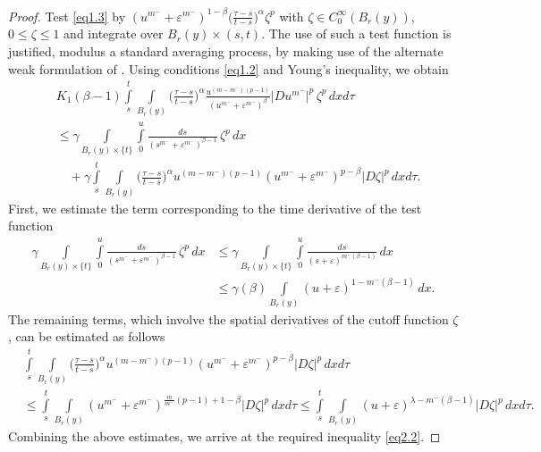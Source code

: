 \documentclass[a4paper,11pt,fullpage]{article}
\numberwithin{equation}{section}
\begin{document}
\begin{proof}
Test \eqref{eq1.3} by $(u^{m^-}+\varepsilon^{m^-})^{1-\beta}\big(\frac{\tau-s}{t-s}\big)^\alpha \zeta^p$ with $\zeta\in C_0^\infty(B_r(y))$, $0\leqslant\zeta\leqslant1$ and integrate over $B_r(y)\times(s, t)$.
The use of such a test function is justified, modulus a standard
 averaging process, by making use of the alternate weak formulation of \cite{KL}. Using conditions \eqref{eq1.2} and  Young's inequality, we obtain
\begin{equation*}
\begin{aligned}
& K_1(\beta-1)\int\limits_s^t\int\limits_{B_r(y)}\Big(\frac{\tau-s}{t-s}\Big)^\alpha 
\frac{u^{(m-m^-)(p-1)}}{(u^{m^-}+\varepsilon^{m^-})^\beta}|D u^{m^-}|^{p}\,\zeta^{p}\,dx d\tau
\\&\leqslant \gamma \int\limits_{B_r(y)\times\{t\}}\int\limits_0^u\frac{ds}{(s^{m^-}+\varepsilon^{m^-})^{\beta-1}}\,\zeta^{p}\,dx
\\&\quad+\gamma\int\limits_s^t\int\limits_{B_{r}(y)}\Big(\frac{\tau-s}{t-s}\Big)^\alpha u^{(m-m^-)(p-1)}(u^{m^-}+\varepsilon^{m^-})^{p-\beta}|D\zeta|^{p}\,dx d\tau.
\end{aligned}
\end{equation*}
First, we estimate the term corresponding to the time derivative of the test function
\begin{equation*}
\begin{aligned}
\gamma \int\limits_{B_{r}(y)\times\{t\}}\int\limits_0^u\frac{ds}{(s^{m^-}+\varepsilon^{m^-})^{\beta-1}}\,\zeta^{p}\,dx
&\leqslant\gamma \int\limits_{B_{r}(y)\times\{t\}}\int\limits_0^u\frac{ds}{(s+\varepsilon)^{m^-(\beta-1)}}\,dx
\\&\leqslant \gamma(\beta)\int\limits_{B_r(y)}(u+\varepsilon)^{1-m^-(\beta-1)}\,dx.
\end{aligned}
\end{equation*}
The remaining terms, which involve the spatial derivatives of the cutoff function $\zeta$, can be estimated as follows
\begin{equation*}
\begin{aligned}
&\int\limits_s^t\int\limits_{B_r(y)}\Big(\frac{\tau-s}{t-s}\Big)^\alpha u^{(m-m^-)(p-1)}(u^{m^-}+\varepsilon^{m^-})^{p-\beta}|D\zeta|^{p}\,dx d\tau
\\&\leqslant
\int\limits_s^t\int\limits_{B_r(y)}(u^{m^-}+\varepsilon^{m^-})^{\frac{m}{m^-}(p-1)+1-\beta}|D \zeta|^{p}\,dx d\tau
\leqslant\int\limits_s^t\int\limits_{B_r(y)}(u+\varepsilon)^{\lambda-m^-(\beta-1)}|D\zeta|^{p}\,dx d\tau.
\end{aligned}
\end{equation*}
Combining the above estimates, we arrive at the required inequality \eqref{eq2.2}.
\end{proof}
\end{document}
